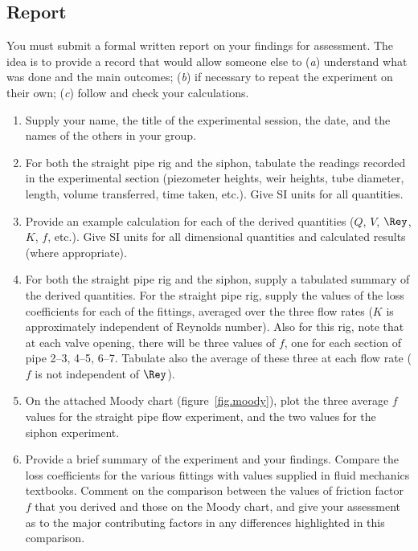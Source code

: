 \documentclass[a4paper,11pt]{article} \pagestyle{plain}
\begin{document}
\subsection*{Report}

You must submit a formal written report on your findings for
assessment. The idea is to provide a record that would allow someone
else to (\textit{a}) understand what was done and the main outcomes;
(\textit{b}) if necessary to repeat the experiment on their own;
(\textit{c}) follow and check your calculations.

\begin{enumerate}
\item
Supply your name, the title of the experimental session, the date, and
the names of the others in your group.
\item
For both the straight pipe rig and the siphon, tabulate the readings
recorded in the experimental section (piezometer heights, weir
heights, tube diameter, length, volume transferred, time taken,
etc.). Give SI units for all quantities.
\item
Provide an example calculation for each of the derived quantities
($Q$, $V$, $\Rey$, $K$, $f$, etc.). Give SI units for all dimensional
quantities and calculated results (where appropriate).
\item
For both the straight pipe rig and the siphon, supply a tabulated
summary of the derived quantities.  For the straight pipe rig, supply
the values of the loss coefficients for each of the fittings, averaged
over the three flow rates ($K$ is approximately independent of
Reynolds number). Also for this rig, note that at each valve opening,
there will be three values of $f$, one for each section of pipe 2--3,
4--5, 6--7. Tabulate also the average of these three at each flow rate
($f$ is not independent of $\Rey$).
\item
On the attached Moody chart (figure~\ref{fig.moody}), plot the three
average $f$ values for the straight pipe flow experiment, and the two
values for the siphon experiment.
\item
Provide a brief summary of the experiment and your findings. Compare
the loss coefficients for the various fittings with values supplied in
fluid mechanics textbooks. Comment on the comparison between the
values of friction factor $f$ that you derived and those on the Moody
chart, and give your assessment as to the major contributing factors
in any differences highlighted in this comparison.
\end{enumerate}
\end{document}
